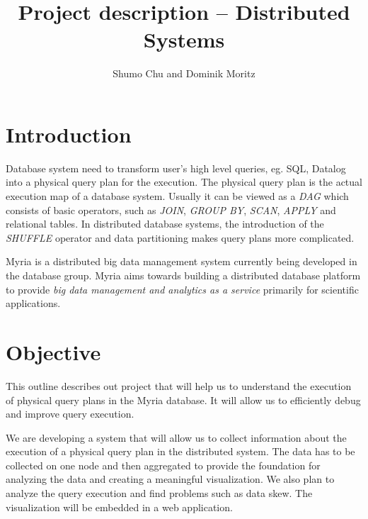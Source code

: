 \documentclass[11pt]{article}
\begin{document}

\title{Project description \--- Distributed Systems}
\author{Shumo Chu and Dominik Moritz}
\date{}

\maketitle

\section{Introduction}

Database system need to transform user's high level queries, eg. SQL, Datalog into a physical query plan for the execution. The physical query plan is the actual execution map of a database system. Usually it can be viewed as a \emph{DAG} which consists of basic operators, such as \emph{JOIN}, \emph{GROUP BY}, \emph{SCAN}, \emph{APPLY} and relational tables. In distributed database systems, the introduction of the \emph{SHUFFLE} operator and data partitioning makes query plans more complicated.

Myria is a distributed big data management system currently being developed in the database group. Myria aims towards building a distributed database platform to provide \emph{big data management and analytics as a service} primarily for scientific applications.

\section{Objective}
\label{sec:objective}

This outline describes out project that will help us to understand the execution of physical query plans in the Myria database. It will allow us to efficiently debug and improve query execution.

We are developing a system that will allow us to collect information about the execution of a physical query plan in the distributed system. The data has to be collected on one node and then aggregated to provide the foundation for analyzing the data and creating a meaningful visualization. We also plan to analyze the query execution and find problems such as data skew. The visualization will be embedded in a web application.

\vspace{10px}
\end{document}
